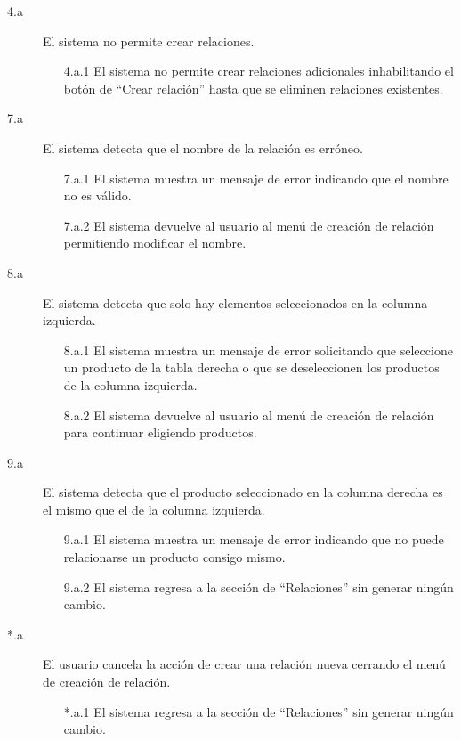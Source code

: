 \begin{description}

    \item[4.a] El sistema no permite crear relaciones.
    \begin{enumerate}
        \item[4.a.1] El sistema no permite crear relaciones adicionales inhabilitando el botón de \enquote{Crear relación} hasta que se eliminen relaciones existentes.
    \end{enumerate}
    
    \item[7.a] El sistema detecta que el nombre de la relación es erróneo.
    \begin{enumerate}
        \item[7.a.1] El sistema muestra un mensaje de error indicando que el nombre no es válido.
        \item[7.a.2] El sistema devuelve al usuario al menú de creación de relación permitiendo modificar el nombre.
    \end{enumerate}
    
    \item[8.a] El sistema detecta que solo hay elementos seleccionados en la columna izquierda.
    \begin{enumerate}
        \item[8.a.1] El sistema muestra un mensaje de error solicitando que seleccione un producto de la tabla derecha o que se deseleccionen los productos de la columna izquierda.
        \item[8.a.2] El sistema devuelve al usuario al menú de creación de relación para continuar eligiendo productos.
    \end{enumerate}

    \item[9.a] El sistema detecta que el producto seleccionado en la columna derecha es el mismo que el de la columna izquierda.
    \begin{enumerate}
        \item [9.a.1] El sistema muestra un mensaje de error indicando que no puede relacionarse un producto consigo mismo.
        \item [9.a.2] El sistema regresa a la sección de \enquote{Relaciones} sin generar ningún cambio.
    \end{enumerate}

    \item[*.a] El usuario cancela la acción de crear una relación nueva cerrando el menú de creación de relación.
    \begin{enumerate}
        \item[*.a.1] El sistema regresa a la sección de \enquote{Relaciones} sin generar ningún cambio.
    \end{enumerate}
\end{description}

